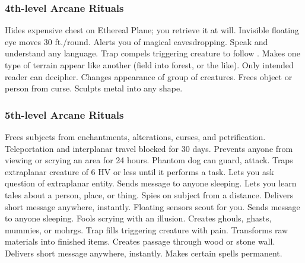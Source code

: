\subsubsection{4th-level Arcane Rituals}
\begin{rituallist}
    \F Hides expensive chest on Ethereal Plane; you retrieve it at will.
     Invisible floating eye moves 30 ft./round.
     Alerts you of magical eavesdropping.
     Speak and understand any language.
     Trap compels triggering creature to follow .
     Makes one type of terrain appear like another (field into forest, or the like).
     Only intended reader can decipher.
     Changes appearance of group of creatures.
     Frees object or person from curse.
     Sculpts metal into any shape.
\end{rituallist}

\subsubsection{5th-level Arcane Rituals}
\begin{rituallist}
     Frees subjects from enchantments, alterations, curses, and petrification.
     Teleportation and interplanar travel blocked for 30 days.
     Prevents anyone from viewing or scrying an area for 24 hours.
     Phantom dog can guard, attack.
     Traps extraplanar creature of 6 HV or less until it performs a task.
     Lets you ask question of extraplanar entity.
     Sends message to anyone sleeping.
    \F Lets you learn tales about a person, place, or thing.
    \F Spies on subject from a distance.
     Delivers short message anywhere, instantly.
     Floating sensors scout for you.
     Sends message to anyone sleeping.
     Fools scrying with an illusion.
     Creates ghouls, ghasts, mummies, or mohrgs.
     Trap fills triggering creature with pain.
     Transforms raw materials into finished items.
     Creates passage through wood or stone wall.
     Delivers short message anywhere, instantly.
     Makes certain spells permanent.
\end{rituallist}

